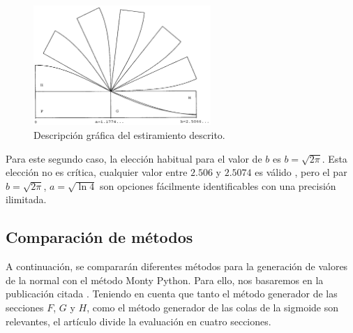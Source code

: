 \documentclass[a4paper,12pt]{article}
\begin{document}
	\begin{figure}[H]
		\centering
		\includegraphics[width=0.6\textwidth]{include/stretching_sigmoid.png}
		\caption{Descripción gráfica del estiramiento descrito. \cite{monty-python}}
	\end{figure}
	
	Para este segundo caso, la elección habitual para el valor de $b$ es $b= \sqrt{2\pi}$. Esta elección no es crítica, cualquier valor entre $2.506$ y $2.5074$ es válido \cite{monty-python}, pero el par $b=\sqrt{2\pi}$, $a = \sqrt{\ln 4}$ son opciones fácilmente identificables con una precisión ilimitada.
	
	
\newpage
	\subsection{Comparación de métodos}
	A continuación, se compararán diferentes métodos para la generación de valores de la normal con el método Monty Python. Para ello, nos basaremos en la publicación citada \cite{comparacion-metodos}. Teniendo en cuenta que tanto el método generador de las secciones $F$, $G$ y $H$, como el método generador de las colas de la sigmoide son relevantes, el artículo divide la evaluación en cuatro secciones.
\end{document}
